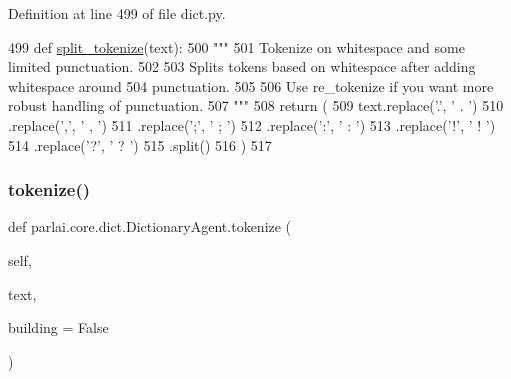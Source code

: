 Definition at line 499 of file dict.\+py.


\begin{DoxyCode}
499     \textcolor{keyword}{def }\hyperlink{namespaceparlai_1_1mturk_1_1tasks_1_1wizard__of__wikipedia_1_1worlds_a040aaf5ecfbddec14f321279454f85a8}{split\_tokenize}(text):
500         \textcolor{stringliteral}{"""}
501 \textcolor{stringliteral}{        Tokenize on whitespace and some limited punctuation.}
502 \textcolor{stringliteral}{}
503 \textcolor{stringliteral}{        Splits tokens based on whitespace after adding whitespace around}
504 \textcolor{stringliteral}{        punctuation.}
505 \textcolor{stringliteral}{}
506 \textcolor{stringliteral}{        Use re\_tokenize if you want more robust handling of punctuation.}
507 \textcolor{stringliteral}{        """}
508         \textcolor{keywordflow}{return} (
509             text.replace(\textcolor{stringliteral}{'.'}, \textcolor{stringliteral}{' . '})
510             .replace(\textcolor{stringliteral}{','}, \textcolor{stringliteral}{' , '})
511             .replace(\textcolor{stringliteral}{';'}, \textcolor{stringliteral}{' ; '})
512             .replace(\textcolor{stringliteral}{':'}, \textcolor{stringliteral}{' : '})
513             .replace(\textcolor{stringliteral}{'!'}, \textcolor{stringliteral}{' ! '})
514             .replace(\textcolor{stringliteral}{'?'}, \textcolor{stringliteral}{' ? '})
515             .split()
516         )
517 
\end{DoxyCode}
\mbox{\label{classparlai_1_1core_1_1dict_1_1DictionaryAgent_aca7e5edfd6502701277cb83b75ff4e96}} 
\subsubsection{\texorpdfstring{tokenize()}{tokenize()}}
{\footnotesize\ttfamily def parlai.\+core.\+dict.\+Dictionary\+Agent.\+tokenize (\begin{DoxyParamCaption}\item[{}]{self,  }\item[{}]{text,  }\item[{}]{building = {\ttfamily False} }\end{DoxyParamCaption})}

